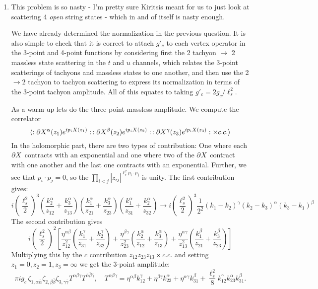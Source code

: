 \documentclass[11pt, class=article, crop=false]{standalone}
\begin{document}
\begin{enumerate}
	\item 
	This problem is so nasty - I'm pretty sure Kiritsis meant for us to just look at scattering 4 \emph{open} string states - which in and of itself is nasty enough. 
	
	We have already determined the normalization in the previous question. It is also simple to check that it is correct to attach $g'_c$ to each vertex operator in the 3-point and 4-point functions by considering first the 2 tachyon $\to$ 2 massless state scattering in the $t$ and $u$ channels, which relates the $3$-point scatterings of tachyons and massless states to one another, and then use the 2 $\to 2$ tachyon to tachyon scattering to express its normalization in terms of the 3-point tachyon amplitude. All of this equates to taking $g'_c = 2 g_c/\ell_s^2$. 
	
	As a warm-up lets do the three-point massless amplitude. We compute the correlator
	\[
		\braket{:\partial X^\alpha(z_1) e^{i p_i X(z_1)}: \, :\partial X^\beta(z_2) e^{i p_i X(z_2)}: \, :\partial X^\gamma(z_3) e^{i p_i X(z_3)}: \times c.c.}
	\]
	In the holomorphic part, there are two types of contribution: One where each $\partial X$ contracts with an exponential and one where two of the $\partial X$ contract with one another and the last one contracts with an exponential. Further, we see that $p_i \cdot p_j = 0$, so the $\prod_{i<j} |z_{ij}|^{\ell_s^2 p_i \cdot p_j}$ is unity. The first contribution gives:
	\[
		i \left(\frac{\ell_s^2}{2}\right)^3 
		\left(\frac{k_2^\alpha}{z_{12}} + \frac{k_3^\alpha}{z_{13}}\right) 
		\left(\frac{k_1^\alpha}{z_{21}} + \frac{k_3^\alpha}{z_{23}}\right)
		\left(\frac{k_1^\alpha}{z_{31}} + \frac{k_2^\alpha}{z_{32}}\right)
		\to i  \left(\frac{\ell_s^2}{2}\right)^3 \frac{1}{2^2}  (k_1-k_2)^\gamma (k_2 - k_3)^\alpha (k_3 - k_1)^\beta
	\]
	The second contribution gives
	\[
		i \left(\frac{\ell_s^2}{2}\right)^2 
		\left[ \frac{\eta^{\alpha \beta}}{z_{12}^2} \left(\frac{k_1^\gamma}{z_{31}} + \frac{k_2^\gamma}{z_{32}} \right)
		+ \frac{\eta^{\beta \gamma}}{z_{23}^2} \left(\frac{k_2^\alpha}{z_{12}} + \frac{k_3^\alpha}{z_{13}} \right)
		+ \frac{\eta^{\alpha \gamma}}{z_{13}^2} \left(\frac{k_1^\beta}{z_{21}} + \frac{k_3^\beta}{z_{23}} \right) \right]
	\]
	Multiplying this by the $c$ contribution $z_{12} z_{23} z_{13} \times c.c.$ and setting $z_1 = 0, z_2 = 1, z_3 = \infty$ we get the 3-point amplitude:
	\begin{equation}\label{eq:3ptmassless}
		\pi i g_c \, \zeta_{1, \alpha \bar \alpha} \zeta_{2, \beta \bar \beta} \zeta_{3, \gamma \bar \gamma} T^{\alpha \beta \gamma} T^{\bar \alpha \bar \beta \bar \gamma}, \quad T^{\alpha \beta \gamma} = \eta^{\alpha \beta} k_{12}^\gamma + \eta^{\beta \gamma} k_{23}^\alpha + \eta^{\alpha \gamma} k_{31}^\beta + \frac{\ell_s^2}{8} k_{12}^\gamma k_{23}^\alpha k_{31}^\beta.
	\end{equation}
	

\end{enumerate}
\end{document}
